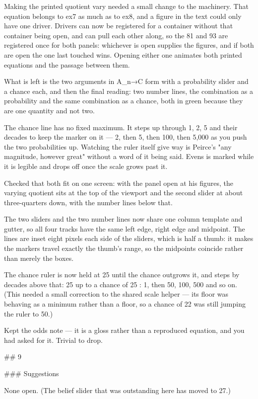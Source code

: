 Making the printed quotient vary needed a small change to the machinery. That
equation belongs to ex7 as much as to ex8, and a figure in the text could only
have one driver. Drivers can now be registered for a container without that
container being open, and can pull each other along, so the 81 and 93 are
registered once for both panels: whichever is open supplies the figures, and if
both are open the one last touched wins. Opening either one animates both
printed equations and the passage between them.

What is left is the two arguments in A_n→C form with a probability slider and a
chance each, and then the final reading: two number lines, the combination as a
probability and the same combination as a chance, both in green because they are
one quantity and not two.

The chance line has no fixed maximum. It steps up through 1, 2, 5 and their
decades to keep the marker on it — 2, then 5, then 100, then 5,000 as you push
the two probabilities up. Watching the ruler itself give way is Peirce's "any
magnitude, however great" without a word of it being said. Evens is marked while
it is legible and drops off once the scale grows past it.

Checked that both fit on one screen: with the panel open at his figures, the
varying quotient sits at the top of the viewport and the second slider at about
three-quarters down, with the number lines below that.

The two sliders and the two number lines now share one column template and
gutter, so all four tracks have the same left edge, right edge and midpoint.
The lines are inset eight pixels each side of the sliders, which is half a
thumb: it makes the markers travel exactly the thumb's range, so the midpoints
coincide rather than merely the boxes.

The chance ruler is now held at 25 until the chance outgrows it, and steps by
decades above that: 25 up to a chance of 25 : 1, then 50, 100, 500 and so on.
(This needed a small correction to the shared scale helper — its floor was
behaving as a minimum rather than a floor, so a chance of 22 was still jumping
the ruler to 50.)

Kept the odds note — it is a gloss rather than a reproduced equation, and you
had asked for it. Trivial to drop.


## 9

### Suggestions

None open. (The belief slider that was outstanding here has moved to 27.)

